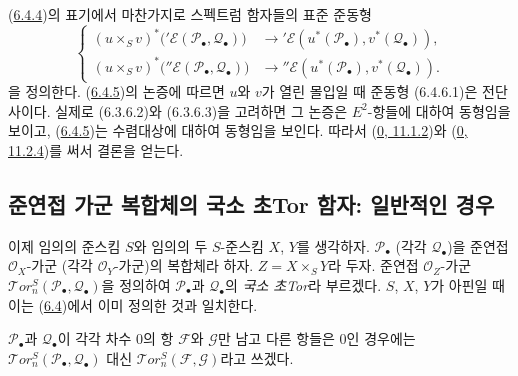 \begin{env}[6.4.6]
\label{III.6.4.6-fr}
(\hyperref[III.6.4.4-fr]{6.4.4})의 표기에서 마찬가지로 스펙트럼
함자들의 표준 준동형
\[
  \left\{
  \begin{aligned}
  (u\times_S v)^*\bigl('\mathscr E(\mathscr P_\bullet,\mathscr Q_\bullet)\bigr)
    &\longrightarrow
      '\mathscr E(u^*(\mathscr P_\bullet),v^*(\mathscr Q_\bullet)),\\
  (u\times_S v)^*\bigl(''\mathscr E(\mathscr P_\bullet,\mathscr Q_\bullet)\bigr)
    &\longrightarrow
      ''\mathscr E(u^*(\mathscr P_\bullet),v^*(\mathscr Q_\bullet)).
  \end{aligned}
  \right.
  \tag{6.4.6.1}\label{III.6.4.6.1.fr}
\]
을 정의한다. (\hyperref[III.6.4.5-fr]{6.4.5})의 논증에 따르면 $u$와
$v$가 열린 몰입일 때 준동형 (6.4.6.1)은 전단사이다. 실제로
(6.3.6.2)와 (6.3.6.3)을 고려하면 그 논증은 $E^2$-항들에 대하여
동형임을 보이고, (\hyperref[III.6.4.5-fr]{6.4.5})는 수렴대상에 대하여
동형임을 보인다. 따라서 (\hyperref[0.11.1.2-fr]{0, 11.1.2})와
(\hyperref[0.11.2.4-fr]{0, 11.2.4})를 써서 결론을 얻는다.
\end{env}

\subsection{준연접 가군 복합체의 국소 초Tor 함자: 일반적인 경우}

\begin{env}[6.5.1]
\label{III.6.5.1-fr}
이제 임의의 준스킴 $S$와 임의의 두 $S$-준스킴 $X$, $Y$를 생각하자.
$\mathscr P_\bullet$ (각각 $\mathscr Q_\bullet$)을 준연접
$\mathscr O_X$-가군 (각각 $\mathscr O_Y$-가군)의 복합체라 하자.
$Z=X\times_S Y$라 두자. 준연접 $\mathscr O_Z$-가군
$\mathscr{T}\!or_n^S(\mathscr P_\bullet,\mathscr Q_\bullet)$을 정의하여
$\mathscr P_\bullet$과 $\mathscr Q_\bullet$의 \emph{국소 초Tor}라
부르겠다. $S$, $X$, $Y$가 아핀일 때 이는
(\hyperref[subsection:III.6.4-ko]{6.4})에서 이미 정의한 것과 일치한다.

$\mathscr P_\bullet$과 $\mathscr Q_\bullet$이 각각 차수 0의 항
$\mathscr F$와 $\mathscr G$만 남고 다른 항들은 0인 경우에는
$\mathscr{T}\!or_n^S(\mathscr P_\bullet,\mathscr Q_\bullet)$ 대신
$\mathscr{T}\!or_n^S(\mathscr F,\mathscr G)$라고 쓰겠다.
\end{env}

